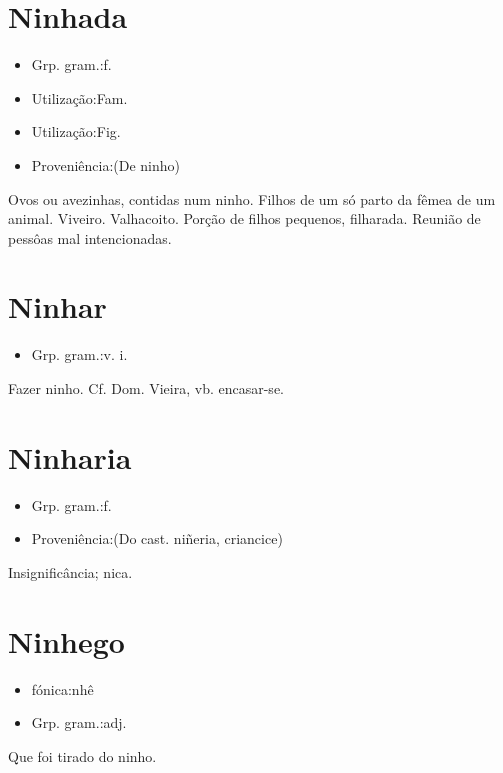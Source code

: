 \section{Ninhada}
\begin{itemize}
\item {Grp. gram.:f.}
\end{itemize}
\begin{itemize}
\item {Utilização:Fam.}
\end{itemize}
\begin{itemize}
\item {Utilização:Fig.}
\end{itemize}
\begin{itemize}
\item {Proveniência:(De \textunderscore ninho\textunderscore )}
\end{itemize}
Ovos ou avezinhas, contidas num ninho.
Filhos de um só parto da fêmea de um animal.
Viveiro.
Valhacoito.
Porção de filhos pequenos, filharada.
Reunião de pessôas mal intencionadas.
\section{Ninhar}
\begin{itemize}
\item {Grp. gram.:v. i.}
\end{itemize}
Fazer ninho. Cf. Dom. Vieira, vb. \textunderscore encasar-se\textunderscore .
\section{Ninharia}
\begin{itemize}
\item {Grp. gram.:f.}
\end{itemize}
\begin{itemize}
\item {Proveniência:(Do cast. \textunderscore niñeria\textunderscore , criancice)}
\end{itemize}
Insignificância; nica.
\section{Ninhego}
\begin{itemize}
\item {fónica:nhê}
\end{itemize}
\begin{itemize}
\item {Grp. gram.:adj.}
\end{itemize}
Que foi tirado do ninho.
